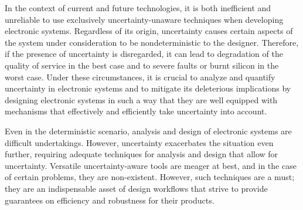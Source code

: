 In the context of current and future technologies, it is both inefficient and
unreliable to use exclusively uncertainty-unaware techniques when developing
electronic systems. Regardless of its origin, uncertainty causes certain aspects
of the system under consideration to be nondeterministic to the designer.
Therefore, if the presence of uncertainty is disregarded, it can lead to
degradation of the quality of service in the best case and to severe faults or
burnt silicon in the worst case. Under these circumstances, it is crucial to
analyze and quantify uncertainty in electronic systems and to mitigate its
deleterious implications by designing electronic systems in such a way that they
are well equipped with mechanisms that effectively and efficiently take
uncertainty into account.

Even in the deterministic scenario, analysis and design of electronic systems
are difficult undertakings. However, uncertainty exacerbates the situation even
further, requiring adequate techniques for analysis and design that allow for
uncertainty. Versatile uncertainty-aware tools are meager at best, and in the
case of certain problems, they are non-existent. However, such techniques are a
must; they are an indispensable asset of design workflows that strive to provide
guarantees on efficiency and robustness for their products.
